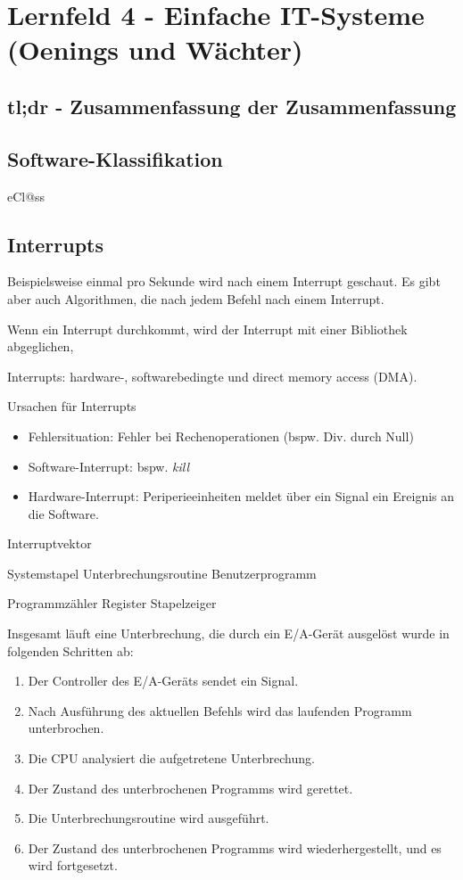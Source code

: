 \section{Lernfeld 4 - Einfache IT-Systeme (Oenings und Wächter)}
%
\subsection{tl;dr - Zusammenfassung der Zusammenfassung}

\subsection{Software-Klassifikation}
eCl@ss


\subsection{Interrupts}
Beispielsweise einmal pro Sekunde wird nach einem Interrupt geschaut. Es gibt aber auch Algorithmen, die nach jedem Befehl nach einem Interrupt.

Wenn ein Interrupt durchkommt, wird der Interrupt mit einer Bibliothek abgeglichen, 

Interrupts: hardware-, softwarebedingte und direct memory access (DMA).

Ursachen für Interrupts
\begin{itemize}
	\item Fehlersituation: Fehler bei Rechenoperationen (bspw. Div. durch Null)
	\item Software-Interrupt: bspw. {\it kill}
	\item Hardware-Interrupt: Periperieeinheiten meldet über ein Signal ein Ereignis an die Software.
\end{itemize}

Interruptvektor

Systemstapel
Unterbrechungsroutine
Benutzerprogramm

Programmzähler
Register
Stapelzeiger

Insgesamt läuft eine Unterbrechung, die durch ein E/A-Gerät ausgelöst wurde in folgenden Schritten ab:
\begin{enumerate}
	\item Der Controller des E/A-Geräts sendet ein Signal.
	\item Nach Ausführung des aktuellen Befehls wird das laufenden Programm unterbrochen.
	\item Die CPU analysiert die aufgetretene Unterbrechung.
	\item Der Zustand des unterbrochenen Programms wird gerettet.
	\item Die Unterbrechungsroutine wird ausgeführt.
	\item Der Zustand des unterbrochenen Programms wird wiederhergestellt, und es wird fortgesetzt.
\end{enumerate}


